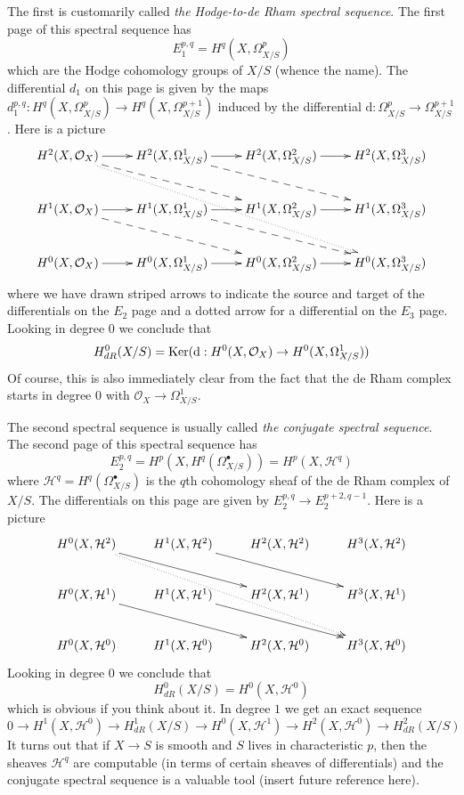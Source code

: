 \medskip\noindent
The first is customarily called {\it the Hodge-to-de Rham spectral sequence}.
The first page of this spectral sequence has
$$
E_1^{p, q} = H^q(X, \Omega^p_{X/S})
$$
which are the Hodge cohomology groups of $X/S$ (whence the name). The
differential $d_1$ on this page is given by the maps
$d_1^{p, q} : H^q(X, \Omega^p_{X/S}) \to H^q(X, \Omega^{p + 1}_{X/S})$
induced by the differential
$\text{d} : \Omega^p_{X/S} \to \Omega^{p + 1}_{X/S}$.
Here is a picture
$$
\xymatrix{
H^2(X, \mathcal{O}_X) \ar[r] \ar@{-->}[rrd] \ar@{..>}[rrrdd] &
H^2(X, \Omega^1_{X/S}) \ar[r] \ar@{-->}[rrd] &
H^2(X, \Omega^2_{X/S}) \ar[r] &
H^2(X, \Omega^3_{X/S}) \\
H^1(X, \mathcal{O}_X) \ar[r] \ar@{-->}[rrd] &
H^1(X, \Omega^1_{X/S}) \ar[r] \ar@{-->}[rrd] &
H^1(X, \Omega^2_{X/S}) \ar[r] &
H^1(X, \Omega^3_{X/S}) \\
H^0(X, \mathcal{O}_X) \ar[r] &
H^0(X, \Omega^1_{X/S}) \ar[r] &
H^0(X, \Omega^2_{X/S}) \ar[r] &
H^0(X, \Omega^3_{X/S})
}
$$
where we have drawn striped arrows to indicate the source and target of
the differentials on the $E_2$ page and a dotted arrow for a differential
on the $E_3$ page. Looking in degree $0$ we conclude that
$$
H^0_{dR}(X/S) =
\mathop{\mathrm{Ker}}(\text{d} : H^0(X, \mathcal{O}_X) \to H^0(X, \Omega^1_{X/S}))
$$
Of course, this is also immediately clear from the fact that the
de Rham complex starts in degree $0$ with $\mathcal{O}_X \to \Omega^1_{X/S}$.

\medskip\noindent
The second spectral sequence is usually called
{\it the conjugate spectral sequence}. The second page of this
spectral sequence has
$$
E_2^{p, q} = H^p(X, H^q(\Omega^\bullet_{X/S})) = H^p(X, \mathcal{H}^q)
$$
where $\mathcal{H}^q = H^q(\Omega^\bullet_{X/S})$ is the $q$th
cohomology sheaf of the de Rham complex of $X/S$. The differentials
on this page are given by $E_2^{p, q} \to E_2^{p + 2, q - 1}$.
Here is a picture
$$
\xymatrix{
H^0(X, \mathcal{H}^2) \ar[rrd] \ar@{..>}[rrrdd] &
H^1(X, \mathcal{H}^2) \ar[rrd] &
H^2(X, \mathcal{H}^2) &
H^3(X, \mathcal{H}^2) \\
H^0(X, \mathcal{H}^1) \ar[rrd] &
H^1(X, \mathcal{H}^1) \ar[rrd] &
H^2(X, \mathcal{H}^1) &
H^3(X, \mathcal{H}^1) \\
H^0(X, \mathcal{H}^0) &
H^1(X, \mathcal{H}^0) &
H^2(X, \mathcal{H}^0) &
H^3(X, \mathcal{H}^0)
}
$$
Looking in degree $0$ we conclude that
$$
H^0_{dR}(X/S) = H^0(X, \mathcal{H}^0)
$$
which is obvious if you think about it. In degree $1$ we get an exact sequence
$$
0 \to H^1(X, \mathcal{H}^0) \to H^1_{dR}(X/S) \to
H^0(X, \mathcal{H}^1) \to H^2(X, \mathcal{H}^0) \to H^2_{dR}(X/S)
$$
It turns out that if $X \to S$ is smooth and $S$ lives in characteristic $p$,
then the sheaves $\mathcal{H}^q$ are computable (in terms of certain
sheaves of differentials) and the conjugate spectral sequence is a valuable
tool (insert future reference here).



